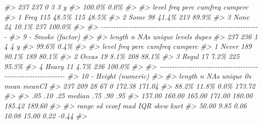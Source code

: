 \documentclass[
]{book}
\newenvironment{Shaded}{\begin{snugshade}}{\end{snugshade}}
\newcommand{\CommentTok}[1]{\textcolor[rgb]{0.56,0.35,0.01}{\textit{#1}}}
\begin{document}
\begin{Shaded}
\begin{Highlighting}[]
\CommentTok{\#\textgreater{}      237    237      0      3      3      y}
\CommentTok{\#\textgreater{}          100.0\%   0.0\%                     }
\CommentTok{\#\textgreater{} }
\CommentTok{\#\textgreater{}    level  freq   perc  cumfreq  cumperc}
\CommentTok{\#\textgreater{} 1   Freq   115  48.5\%      115    48.5\%}
\CommentTok{\#\textgreater{} 2   Some    98  41.4\%      213    89.9\%}
\CommentTok{\#\textgreater{} 3   None    24  10.1\%      237   100.0\%}
\CommentTok{\#\textgreater{} }
\CommentTok{\#\textgreater{} {-}{-}{-}{-}{-}{-}{-}{-}{-}{-}{-}{-}{-}{-}{-}{-}{-}{-}{-}{-}{-}{-}{-}{-}{-}{-}{-}{-}{-}{-}{-}{-}{-}{-}{-}{-}{-}{-}{-}{-}{-}{-}{-}{-}{-}{-}{-}{-}{-}{-}{-}{-}{-}{-}{-}{-}{-}{-}{-}{-}{-}{-}{-} }
\CommentTok{\#\textgreater{} 9 {-} Smoke (factor)}
\CommentTok{\#\textgreater{} }
\CommentTok{\#\textgreater{}   length      n    NAs unique levels  dupes}
\CommentTok{\#\textgreater{}      237    236      1      4      4      y}
\CommentTok{\#\textgreater{}           99.6\%   0.4\%                     }
\CommentTok{\#\textgreater{} }
\CommentTok{\#\textgreater{}    level  freq   perc  cumfreq  cumperc}
\CommentTok{\#\textgreater{} 1  Never   189  80.1\%      189    80.1\%}
\CommentTok{\#\textgreater{} 2  Occas    19   8.1\%      208    88.1\%}
\CommentTok{\#\textgreater{} 3  Regul    17   7.2\%      225    95.3\%}
\CommentTok{\#\textgreater{} 4  Heavy    11   4.7\%      236   100.0\%}
\CommentTok{\#\textgreater{} }
\CommentTok{\#\textgreater{} {-}{-}{-}{-}{-}{-}{-}{-}{-}{-}{-}{-}{-}{-}{-}{-}{-}{-}{-}{-}{-}{-}{-}{-}{-}{-}{-}{-}{-}{-}{-}{-}{-}{-}{-}{-}{-}{-}{-}{-}{-}{-}{-}{-}{-}{-}{-}{-}{-}{-}{-}{-}{-}{-}{-}{-}{-}{-}{-}{-}{-}{-}{-} }
\CommentTok{\#\textgreater{} 10 {-} Height (numeric)}
\CommentTok{\#\textgreater{} }
\CommentTok{\#\textgreater{}   length       n     NAs  unique      0s    mean  meanCI\textquotesingle{}}
\CommentTok{\#\textgreater{}      237     209      28      67       0  172.38  171.04}
\CommentTok{\#\textgreater{}            88.2\%   11.8\%            0.0\%          173.72}
\CommentTok{\#\textgreater{}                                                         }
\CommentTok{\#\textgreater{}      .05     .10     .25  median     .75     .90     .95}
\CommentTok{\#\textgreater{}   157.00  160.00  165.00  171.00  180.00  185.42  189.60}
\CommentTok{\#\textgreater{}                                                         }
\CommentTok{\#\textgreater{}    range      sd   vcoef     mad     IQR    skew    kurt}
\CommentTok{\#\textgreater{}    50.00    9.85    0.06   10.08   15.00    0.22   {-}0.44}
\CommentTok{\#\textgreater{}                                                         }

\end{Highlighting}
\end{Shaded}
\end{document}
